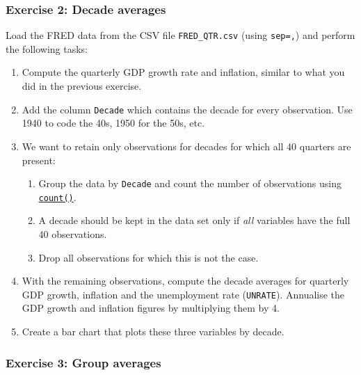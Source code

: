 \documentclass[10pt]{scrartcl}
\providecommand{\tightlist}{%
      \setlength{\itemsep}{0pt}\setlength{\parskip}{0pt}}
\begin{document}
    \hypertarget{exercise-2-decade-averages}{%
\subsubsection{Exercise 2: Decade
averages}\label{exercise-2-decade-averages}}

Load the FRED data from the CSV file \texttt{FRED\_QTR.csv} (using
\texttt{sep=\textquotesingle{},\textquotesingle{}}) and perform the
following tasks:

\begin{enumerate}
\def\labelenumi{\arabic{enumi}.}
\tightlist
\item
  Compute the quarterly GDP growth rate and inflation, similar to what
  you did in the previous exercise.
\item
  Add the column \texttt{Decade} which contains the decade for every
  observation. Use 1940 to code the 40s, 1950 for the 50s, etc.
\item
  We want to retain only observations for decades for which all 40
  quarters are present:

  \begin{enumerate}
  \def\labelenumii{\arabic{enumii}.}
  \tightlist
  \item
    Group the data by \texttt{Decade} and count the number of
    observations using
    \href{https://pandas.pydata.org/pandas-docs/stable/reference/api/pandas.DataFrame.count.html}{\texttt{count()}}.
  \item
    A decade should be kept in the data set only if \emph{all} variables
    have the full 40 observations.
  \item
    Drop all observations for which this is not the case.
  \end{enumerate}
\item
  With the remaining observations, compute the decade averages for
  quarterly GDP growth, inflation and the unemployment rate
  (\texttt{UNRATE}). Annualise the GDP growth and inflation figures by
  multiplying them by 4.
\item
  Create a bar chart that plots these three variables by decade.
\end{enumerate}

    \hypertarget{exercise-3-group-averages}{%
\subsubsection{Exercise 3: Group
averages}\label{exercise-3-group-averages}}
\end{document}
